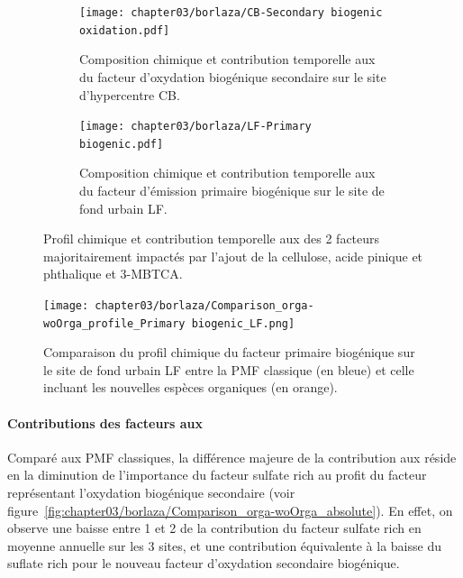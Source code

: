 \begin{figure}[ht]
    \centering
    \begin{subfigure}[t]{1\textwidth}
    \begin{center}
        \texttt{[image: chapter03/borlaza/CB-Secondary biogenic oxidation.pdf]}
    \end{center}
    \caption{Composition chimique et contribution temporelle aux \PMdix{} du facteur
    d'oxydation biogénique secondaire sur le site d'hypercentre CB.}%
    \label{fig:chapter03/borlaza/CB-SBO}
    \end{subfigure}
    \begin{subfigure}[t]{1\textwidth}
    \begin{center}
        \texttt{[image: chapter03/borlaza/LF-Primary biogenic.pdf]}
    \end{center}
    \caption{Composition chimique et contribution temporelle aux \PMdix{} du facteur
    d'émission primaire biogénique sur le site de fond urbain LF.}%
    \label{fig:chapter03/borlaza/LF-PBOA}
    \end{subfigure}
    \caption{Profil chimique et contribution temporelle aux \PMdix{} des 2 facteurs
        majoritairement impactés par l'ajout de la cellulose, acide pinique et phthalique
        et 3-MBTCA.
    }%
    \label{fig:chapter03/borlaza/pmf_profiles}
\end{figure}

\begin{figure}[ht]
    \centering
    \texttt{[image: chapter03/borlaza/Comparison\_orga-woOrga\_profile\_Primary biogenic\_LF.png]}
    \caption{Comparaison du profil chimique du facteur primaire biogénique sur le site de
        fond urbain LF entre la PMF classique (en bleue) et celle incluant les nouvelles
    espèces organiques (en orange).}%
    \label{fig:chapter03/borlaza/comparaison-classique-orga}
\end{figure}

\paragraph{Contributions des facteurs aux \PMdix}%
\label{par:contributions_des_facteurs_aux_pmdix}

Comparé aux PMF classiques, la différence majeure de la contribution aux \PMdix{} réside
en la diminution de l'importance du facteur sulfate rich au profit du facteur représentant
l'oxydation biogénique secondaire (voir
figure~\ref{fig:chapter03/borlaza/Comparison_orga-woOrga_absolute}).  En effet, on
observe une baisse entre \SI{1}{\ugm} et \SI{2}{\ugm} de la contribution du facteur
sulfate rich en moyenne annuelle sur les 3 sites, et une contribution équivalente à la
baisse du suflate rich pour le nouveau facteur d'oxydation secondaire biogénique.

